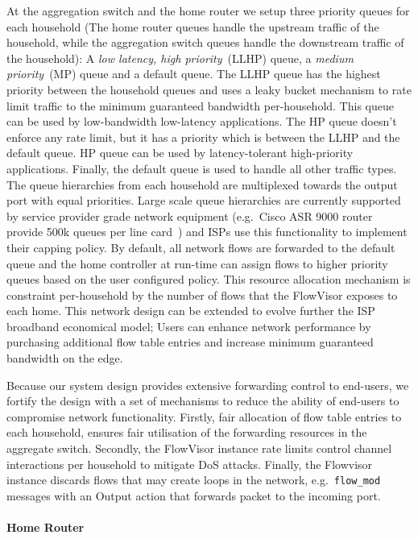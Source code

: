 At the aggregation switch and the home router we setup three priority queues for
each household (The home router queues handle the upstream traffic of the
household, while the aggregation switch queues handle the downstream traffic of
the household): A {\it low latency, high priority}~(LLHP) queue, a {\it medium
  priority}~(MP) queue and a default queue.  The LLHP queue has the highest
priority between the household queues and uses a leaky bucket mechanism to rate
limit traffic to the minimum guaranteed bandwidth per-household. This queue can
be used by low-bandwidth low-latency applications. The HP queue doesn't enforce
any rate limit, but it has a priority which is between the LLHP and the default
queue.  HP queue can be used by latency-tolerant high-priority applications.
Finally, the default queue is used to handle all other traffic types.  The queue
hierarchies from each household are multiplexed towards the output port with
equal priorities.  Large scale queue hierarchies are currently supported by
service provider grade network equipment (e.g.~Cisco ASR 9000 router provide
500k queues per line card~\cite{cisco-asr-qos}) and ISPs use this functionality
to implement their capping policy. By default, all network flows are forwarded
to the default queue and the home \of controller at run-time can assign flows to
higher priority queues based on the user configured policy.  This resource
allocation mechanism is constraint per-household by the number of flows that the
FlowVisor exposes to each home.  This network design can be extended to evolve
further the ISP broadband economical model; Users can enhance network
performance by purchasing additional flow table entries and increase minimum
guaranteed bandwidth on the edge. 

Because our system design provides extensive forwarding control to end-users, we
fortify the design with a set of mechanisms to reduce the ability of end-users
to compromise network functionality.  Firstly, fair allocation of flow table
entries to each household, ensures fair utilisation of the forwarding resources
in the aggregate switch. Secondly, the FlowVisor instance rate limits \of
control channel interactions per household to mitigate DoS attacks. Finally, the
Flowvisor instance discards flows that may create loops in the network,
e.g.~{\tt flow\_mod} messages with an Output action  that forwards packet to the
incoming port. 

\paragraph*{Home Router}

